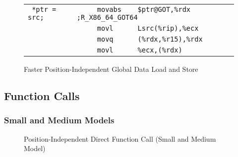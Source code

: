 \begin{figure}[H]
\Hrule
\caption{Faster Position-Independent Global Data Load and Store}
\label{large_rip_rel_addr_pic}
\begin{center}
\begin{footnotesize}
\begin{tabular}{|l|l|}
\hline
\verb# *ptr = src; # & \verb#     movabs    $ptr@GOT,%rdx    ;R_X86_64_GOT64 # \\
\verb#             # & \verb#     movl      Lsrc(%rip),%ecx  # \\
\verb#             # & \verb#     movq      (%rdx,%r15),%rdx # \\
\verb#             # & \verb#     movl      %ecx,(%rdx)      # \\
\hline
\end{tabular} %
\end{footnotesize}
\end{center}
\end{figure}

\subsection{Function Calls}

\subsubsection{Small and Medium Models}

\begin{figure}[H]
\Hrule
\caption{Position-Independent Direct Function Call (Small and Medium Model)}
\begin{center}
\end{center}
\Hrule
\end{figure}

